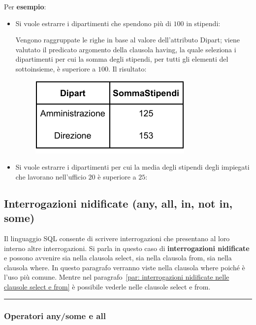 \documentclass[a4paper]{article}
\newcommand{\longline}{\noindent\rule{\textwidth}{0.4pt}}
\begin{document}
	\noindent
	Per \textcolor{Green4}{\textbf{esempio}}:
	\begin{itemize}
		\item Si vuole estrarre i dipartimenti che spendono più di $100$ in stipendi:
		
		Vengono raggruppate le righe in base al valore dell'attributo \textsf{Dipart}; viene valutato il predicato argomento della clausola \textsf{having}, la quale seleziona i dipartimenti per cui la somma degli stipendi, per tutti gli elementi del sottoinsieme, è superiore a $100$. Il risultato:
		\begin{figure}[!htp]
			\centering
			\includegraphics[width=.3\textwidth]{img/having-ex1.pdf}
		\end{figure}
		
		\item Si vuole estrarre i dipartimenti per cui la media degli stipendi degli impiegati che lavorano nell'ufficio $20$ è superiore a $25$:
		
	\end{itemize}\newpage

	\subsection{Interrogazioni nidificate (\textsf{any}, \textsf{all}, \textsf{in}, \textsf{not in}, \textsf{some})}
	
	Il linguaggio SQL consente di scrivere interrogazioni che presentano al loro interno altre interrogazioni. Si parla in questo caso di \textcolor{Red3}{\textbf{interrogazioni nidificate}} e possono avvenire sia nella clausola \textsf{select}, sia nella clausola \textsf{from}, sia nella clausola \textsf{where}. In questo paragrafo verranno viste nella clausola \textsf{where} poiché è l'uso più comune. Mentre nel paragrafo~\ref{par: interrogazioni nidificate nelle clausole select e from} è possibile vederle nelle clausole \textsf{select} e \textsf{from}.
	
	\longline
	
	\subsubsection{Operatori \textsf{any}/\textsf{some} e \textsf{all}}
	
\end{document}
